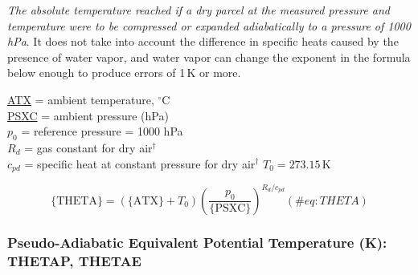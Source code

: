 \documentclass[
  english,
]{book}
\begin{document}
\emph{The absolute temperature reached if a dry parcel at the measured
pressure and temperature were to be compressed or expanded adiabatically
to a pressure of 1000 hPa}. It does not take into account the difference
in specific heats caused by the presence of water vapor, and water vapor
can change the exponent in the formula below enough to produce errors of
1 K or more.

\protect\hyperlink{ambient-t}{ATX} = ambient temperature,
\(^{\circ}\)C\\
\protect\hyperlink{psx}{PSXC} = ambient pressure (hPa)\\
\(p_{0}\) = reference pressure = 1000 hPa\\
\(R_{d}\) = gas constant for dry air\(^{\dagger}\)\\
\(c_{pd}\) = specific heat at constant pressure for dry
air\(^{\dagger}\) \(T_0=273.15\,\mathrm{K}\)

\begin{equation}
\mathrm{\{THETA\}}=\left(\mathrm{\{ATX\}}+T_{0}\right)\left(\frac{p_{0}}{\mathrm{\{PSXC\}}}\right)^{R_{d}/c_{pd}}
(\#eq:THETA)
\end{equation}

\hypertarget{thetae}{%
\subsubsection*{Pseudo-Adiabatic Equivalent Potential Temperature (K):
THETAP, THETAE}\label{thetae}}
\end{document}
